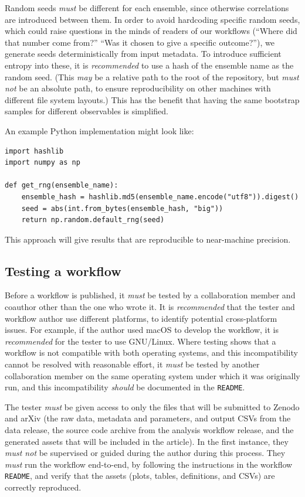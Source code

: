 \documentclass{article}
\newcommand\rfcword[1]{\emph{#1}\xspace}
\newcommand\must{\rfcword{must}}
\newcommand\mustnot{\rfcword{must not}}
\newcommand\should{\rfcword{should}}
\newcommand\recommended{\rfcword{recommended}}
\newcommand\may{\rfcword{may}}
\newcommand\filename[1]{\texttt{#1}\xspace}
\newcommand\readme{\filename{README}}
\begin{document}
Random seeds \must be different for each ensemble,
since otherwise correlations are introduced between them.
In order to avoid hardcoding specific random seeds,
which could raise questions in the minds of readers of our workflows
(``Where did that number come from?''
``Was it chosen to give a specific outcome?''),
we generate seeds deterministically from input metadata.
To introduce sufficient entropy into these,
it is \recommended to use a hash of the ensemble name as the random seed.
(This \may be a relative path to the root of the repository,
but \mustnot be an absolute path,
to ensure reproducibility on other machines with different file system layouts.)
This has the benefit that
having the same bootstrap samples for different observables is simplified.

An example Python implementation might look like:

\begin{verbatim}
import hashlib
import numpy as np

def get_rng(ensemble_name):
    ensemble_hash = hashlib.md5(ensemble_name.encode("utf8")).digest()
    seed = abs(int.from_bytes(ensemble_hash, "big"))
    return np.random.default_rng(seed)
\end{verbatim}

This approach will give results that are reproducible to near-machine precision.

\subsection{Testing a workflow}\label{sec:testing}

Before a workflow is published,
it \must be tested by a collaboration member and coauthor other than the one who wrote it.
It is \recommended that the tester and workflow author use different platforms,
to identify potential cross-platform issues.
For example,
if the author used macOS to develop the workflow,
it is \recommended for the tester to use GNU/Linux.
Where testing shows that a workflow is not compatible with both operating systems,
and this incompatibility cannot be resolved with reasonable effort,
it \must be tested by another collaboration member
on the same operating system under which it was originally run,
and this incompatibility \should be documented in the \readme.

The tester \must be given access to only the files that will be submitted to Zenodo and arXiv
(the raw data, metadata and parameters, and output CSVs from the data release,
the source code archive from the analysis workflow release,
and the generated assets that will be included in the article).
In the first instance,
they \mustnot be supervised or guided during the author during this process.
They \must run the workflow end-to-end,
by following the instructions in the workflow \readme,
and verify that the assets
(plots, tables, definitions, and CSVs)
are correctly reproduced.
\end{document}
